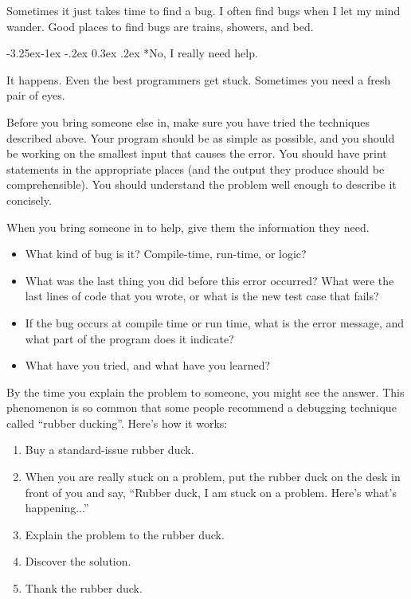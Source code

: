 \documentclass[12pt]{book}
\makeatletter
\theoremstyle{exercise}
\renewcommand\subsection{\@startsection{subsection}{2}{\z@}%
    {-3.25ex\@plus -1ex \@minus -.2ex}%
    {0.3ex \@plus .2ex}%
    {\normalfont\large\bfseries}}
\makeatother
\begin{document}
Sometimes it just takes time to find a bug.
I often find bugs when I let my mind wander.
Good places to find bugs are trains, showers, and bed.


\subsection*{No, I really need help.}

It happens.
Even the best programmers get stuck.
Sometimes you need a fresh pair of eyes.

Before you bring someone else in, make sure you have tried the techniques described above.
Your program should be as simple as possible, and you should be working on the smallest input that causes the error.
You should have print statements in the appropriate places (and the output they produce should be comprehensible).
You should understand the problem well enough to describe it concisely.

When you bring someone in to help, give them the information they need.

\begin{itemize}

\item What kind of bug is it?
Compile-time, run-time, or logic?

\item What was the last thing you did before this error occurred?
What were the last lines of code that you wrote, or what is the new test case that fails?

\item If the bug occurs at compile time or run time, what is the error message, and what part of the program does it indicate?

\item What have you tried, and what have you learned?

\end{itemize}

By the time you explain the problem to someone, you might see the answer.  This phenomenon is so common that some people recommend a debugging technique
called ``rubber ducking''.
Here's how it works:

\begin{enumerate}

\item Buy a standard-issue rubber duck.

\item When you are really stuck on a problem, put the rubber duck on the desk in front of you and say, ``Rubber duck, I am stuck on a problem.  Here's what's happening...''

\item Explain the problem to the rubber duck.

\item Discover the solution.

\item Thank the rubber duck.

\end{enumerate}
\end{document}
